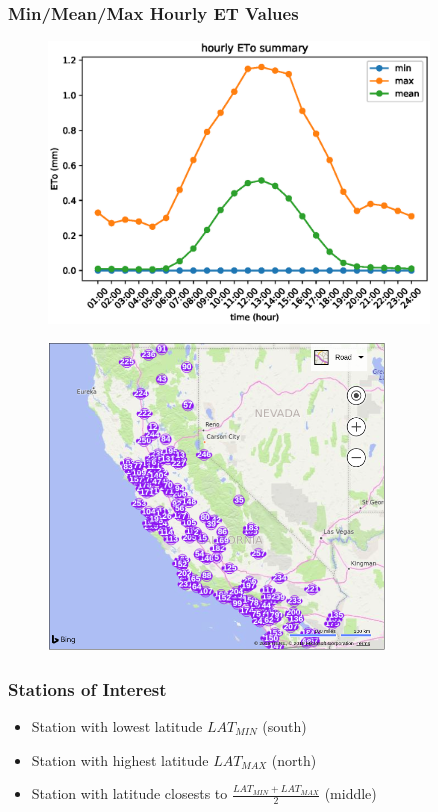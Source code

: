 \begin{frame}
\frametitle{Min/Mean/Max Hourly ET Values}
\begin{figure}
	\includegraphics[width=0.9\textwidth]{images/summary-hourly-eto-values}
\end{figure}
\end{frame}

\begin{frame}
\begin{figure}
\includegraphics[width=0.8\textwidth]{images/cimis-station-location}
\end{figure}
\end{frame}

\begin{frame}
\frametitle{Stations of Interest}
\begin{itemize}
	\setlength\itemsep{1em}
	\item Station with lowest latitude $LAT_{MIN}$ (south)
	\item Station with highest latitude $LAT_{MAX}$ (north)
	\item Station with latitude closests to $\frac{LAT_{MIN}+LAT_{MAX}}{2}$ (middle)
\end{itemize}
\end{frame}

